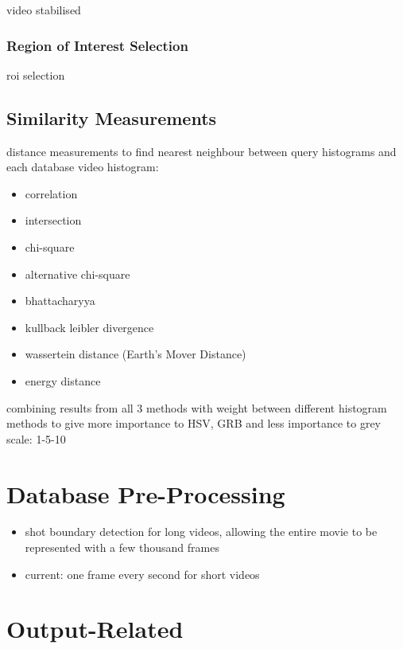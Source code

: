 video stabilised

\subsubsection{Region of Interest Selection}

roi selection

\subsection{Similarity Measurements}

distance measurements to find nearest neighbour between query histograms and each database video histogram:

\begin{itemize}
    \item correlation
    \item intersection
    \item chi-square
    \item alternative chi-square
    \item bhattacharyya
    \item kullback leibler divergence
    \item wassertein distance (Earth's Mover Distance)
    \item energy distance
\end{itemize}

combining results from all 3 methods with weight between different histogram methods to give more importance to HSV, GRB and less importance to grey scale: 1-5-10

\section{Database Pre-Processing}

\begin{itemize}
    \item shot boundary detection for long videos, allowing the entire movie to be represented with a few thousand frames
    \item current: one frame every second for short videos
\end{itemize}

\section{Output-Related}

